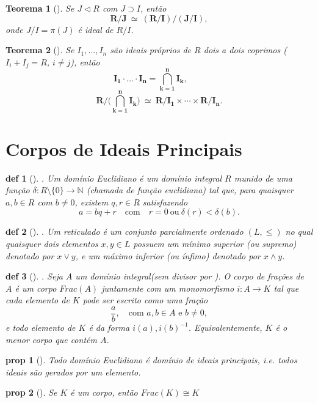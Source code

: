 \documentclass[11pt]{article}
\newcommand{\defname}[1]{\colorbox{yellow!30}{\strut \textbf{#1}}}
\newtheorem*{theorem}{Teorema}
\newtheorem*{proposition}{prop}
\newtheorem*{definition}{def}
\theoremstyle{definition}
\begin{document}
\begin{multicols}{3}
\begin{theorem}[\defname{Relação de Quocientes}]
Se \(J\triangleleft R\) com \(J\supset I\), então
\[
\mathbf{R/J \ \simeq\ (R/I)/(J/I)},
\]
onde \(J/I=\pi(J)\) é ideal de \(R/I\).
\end{theorem}

\begin{theorem}[\defname{Chinês dos Restos}]
Se \(I_1,\dots,I_n\) são ideais próprios de \(R\) dois a dois coprimos (\(I_i+I_j=R\), \(i\neq j\)), então
\[
\mathbf{I_1\cdot\ldots\cdot I_n=\bigcap_{k=1}^n I_k},\qquad 
\]
\[
\mathbf{R/\bigl(\bigcap_{k=1}^n I_k\bigr)\ \simeq\ R/I_1\times\cdots\times R/I_n}.
\]
\end{theorem}
\end{multicols}
\section{Corpos de Ideais Principais}
\begin{multicols}{3}
    
\begin{definition}[\defname{Domínio Euclidiano}]. 
Um \emph{domínio Euclidiano} é um domínio integral \(R\) munido de uma função 
\(\delta : R \setminus \{0\} \to \mathbb{N}\) (chamada de \emph{função euclidiana}) tal que, para quaisquer \(a,b \in R\) com \(b \neq 0\), existem \(q,r \in R\) satisfazendo
\[
a = bq + r \quad \text{com} \quad r = 0 \ \text{ou} \ \delta(r) < \delta(b).
\]
\end{definition}

\begin{definition}[\defname{Reticulado(Lattice)}]. 
Um \emph{reticulado} é um conjunto parcialmente ordenado \((L,\leq)\) no qual quaisquer dois elementos \(x, y \in L\) possuem um \emph{mínimo superior} (ou \emph{supremo}) denotado por \(x \vee y\), e um \emph{máximo inferior} (ou \emph{ínfimo}) denotado por \(x \wedge y\).
\end{definition}


\begin{definition}[\defname{Corpo de frações}]. 
Seja \(A\) um domínio integral(sem divisor por ). O \emph{corpo de frações} de \(A\) é um corpo \(Frac(A)\) 
juntamente com um monomorfismo \(i : A \to K\) tal que cada elemento de \(K\) pode ser escrito como uma fração
\[
\frac{a}{b}, \quad \text{com } a,b \in A \text{ e } b \neq 0,
\]
e todo elemento de \(K\) é da forma \(i(a) , i(b)^{-1}\).  
Equivalentemente, \(K\) é o menor corpo que contém \(A\).  
\end{definition}


\begin{proposition}[\defname{Euclidiano implica D.I.P}]
    Todo domínio Euclidiano é domínio de ideais principais, i.e. todos ideais são gerados por um elemento.
\end{proposition}
\begin{proposition}[\defname{Isomorfismo com Corpo de Fracões}]
    Se $K$ é um corpo, então $Frac(K) \cong K$
\end{proposition}
\end{multicols}
\end{document}
